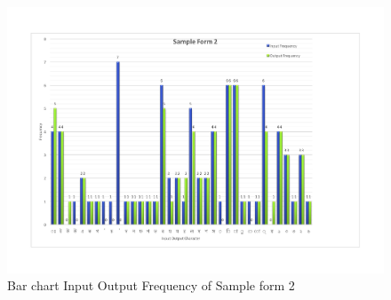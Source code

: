 \begin{figure}[H]
\centering
\includegraphics[width=1\textwidth]{Bform2.pdf}
\caption {Bar chart Input Output Frequency of Sample form 2}
\label {fig:Bbar2}
\end{figure}



